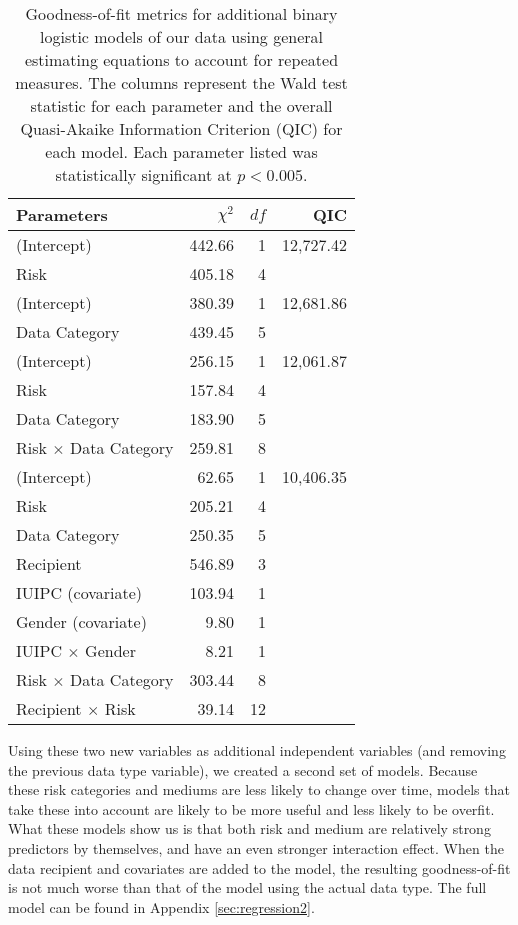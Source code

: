 \begin{table}[t]
\centering
\begin{tabular}{|l| r| r| r|}
\hline
Parameters & $\chi^2$ & $df$ & QIC\\
\hline
\hline
(Intercept) & 442.66 & 1 & 12,727.42\\
Risk & 405.18 & 4 & \\
\hline
(Intercept) & 380.39 & 1 & 12,681.86\\
Data Category & 439.45 & 5 & \\
\hline
(Intercept) & 256.15 & 1 & 12,061.87\\
Risk & 157.84 & 4 & \\
Data Category & 183.90 & 5 & \\
Risk $\times$ Data Category & 259.81 & 8 & \\
\hline
(Intercept) & 62.65 & 1 & 10,406.35\\
Risk & 205.21 & 4 & \\
Data Category & 250.35 & 5 & \\
Recipient & 546.89 & 3 & \\
IUIPC (covariate) & 103.94 & 1 & \\
Gender (covariate) & 9.80 & 1 & \\
IUIPC $\times$ Gender & 8.21 & 1 & \\
Risk $\times$ Data Category & 303.44 & 8 & \\
Recipient $\times$ Risk & 39.14 & 12 & \\
\hline
\end{tabular}
\caption{Goodness-of-fit metrics for additional binary logistic models of our data using general estimating equations to account for repeated measures. The columns represent the Wald test statistic for each parameter and the overall Quasi-Akaike Information Criterion (QIC) for each model. Each parameter listed was statistically significant at $p<0.005$.}
\label{regression2}
\end{table}


Using these two new variables as additional independent variables (and removing the previous data type variable), we created a second set of models. Because these risk categories and mediums are less likely to change over time, models that take these into account are likely to be more useful and less likely to be overfit. What these models show us is that both risk and medium are relatively strong predictors by themselves, and have an even stronger interaction effect. When the data recipient and covariates are added to the model, the resulting goodness-of-fit is not much worse than that of the model using the actual data type. The full model can be found in Appendix \ref{sec:regression2}.

